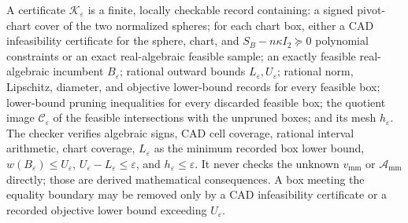 A certificate \(\mathscr K_{\varepsilon}\) is a finite, locally checkable record containing: a signed pivot-chart cover of the two normalized spheres; for each chart box, either a CAD infeasibility certificate for the sphere, chart, and \(S_B-n\kappa I_2\succeq0\) polynomial constraints or an exact real-algebraic feasible sample; an exactly feasible real-algebraic incumbent \(B_{\varepsilon}\); rational outward bounds \(L_{\varepsilon},U_{\varepsilon}\); rational norm, Lipschitz, diameter, and objective lower-bound records for every feasible box; lower-bound pruning inequalities for every discarded feasible box; the quotient image \(\mathcal C_\varepsilon\) of the feasible intersections with the unpruned boxes; and its mesh \(h_{\varepsilon}\).  The checker verifies algebraic signs, CAD cell coverage, rational interval arithmetic, chart coverage, \(L_{\varepsilon}\) as the minimum recorded box lower bound, \(w(B_{\varepsilon})\le U_{\varepsilon}\), \(U_{\varepsilon}-L_{\varepsilon}\le\varepsilon\), and \(h_{\varepsilon}\le\varepsilon\).  It never checks the unknown \(v_{\mathrm{mm}}\) or \(\mathcal A_{\mathrm{mm}}\) directly; those are derived mathematical consequences.  A box meeting the equality boundary may be removed only by a CAD infeasibility certificate or a recorded objective lower bound exceeding \(U_{\varepsilon}\).